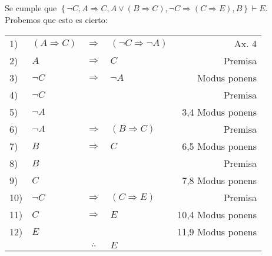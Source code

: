 \documentclass[12pt]{report}
\theoremstyle{largebreak}
\begin{document}
    \begin{exa}
        Se cumple que $\left\{\neg C,A\Rightarrow C, A\lor(B\Rightarrow C),\neg C\Rightarrow (C\Rightarrow E), B \right\}\vdash E$. Probemos que esto es cierto:
        \begin{center}
            \begin{tabular}{l l c l r}
                1) & $(A\Rightarrow C)$ & $\Rightarrow$ & $(\neg C\Rightarrow\neg A)$ & Ax. 4 \\
                2) & $A$ & $\Rightarrow$ & $C$ & Premisa \\
                3) & $\neg C$ & $\Rightarrow$ & $\neg A$& Modus ponens \\
                4) & $\neg C$ &  &  & Premisa\\
                5) & $\neg A$ &  &  & 3,4 Modus ponens\\
                6) & $\neg A$ & $\Rightarrow$ & $(B\Rightarrow C)$ & Premisa\\
                7) & $B$ & $\Rightarrow$ & $C$ & 6,5 Modus ponens\\
                8) & $B$ &  &  & Premisa\\
                9) & $C$ &  &  & 7,8 Modus ponens\\
                10) & $\neg C$ & $\Rightarrow$ & $(C\Rightarrow E)$ & Premisa\\
                11) & $C$ & $\Rightarrow$ & $E$  & 10,4 Modus ponens\\
                12) & $E$ &  &  & 11,9 Modus ponens\\
                \hline
                & & $\therefore$ & $E$ & \\
            \end{tabular}
        \end{center}
    \end{exa}
\end{document}

